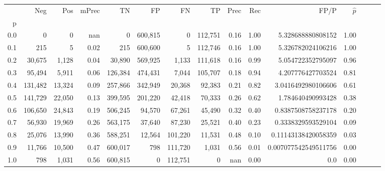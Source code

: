 \begin{tabular}{rrrrrrrrrrrrrrr}
\toprule
{} &      Neg &     Pos & mPrec &       TN &       FP &       FN &       TP &  Prec &   Rec &                  FP/P & $\hat{p}$ \\
p   &          &         &       &          &          &          &          &       &       &                       &           \\
\midrule
0.0 &        0 &       0 &   nan &        0 &  600,815 &        0 &  112,751 &  0.16 &  1.00 &     5.328688880808152 &      1.00 \\
0.1 &      215 &       5 &  0.02 &      215 &  600,600 &        5 &  112,746 &  0.16 &  1.00 &     5.326782024106216 &      1.00 \\
0.2 &   30,675 &   1,128 &  0.04 &   30,890 &  569,925 &    1,133 &  111,618 &  0.16 &  0.99 &     5.054722352795097 &      0.96 \\
0.3 &   95,494 &   5,911 &  0.06 &  126,384 &  474,431 &    7,044 &  105,707 &  0.18 &  0.94 &     4.207776427703524 &      0.81 \\
0.4 &  131,482 &  13,324 &  0.09 &  257,866 &  342,949 &   20,368 &   92,383 &  0.21 &  0.82 &    3.0416492980106606 &      0.61 \\
0.5 &  141,729 &  22,050 &  0.13 &  399,595 &  201,220 &   42,418 &   70,333 &  0.26 &  0.62 &     1.784640490993428 &      0.38 \\
0.6 &  106,650 &  24,843 &  0.19 &  506,245 &   94,570 &   67,261 &   45,490 &  0.32 &  0.40 &    0.8387508758237178 &      0.20 \\
0.7 &   56,930 &  19,969 &  0.26 &  563,175 &   37,640 &   87,230 &   25,521 &  0.40 &  0.23 &    0.3338329593529104 &      0.09 \\
0.8 &   25,076 &  13,990 &  0.36 &  588,251 &   12,564 &  101,220 &   11,531 &  0.48 &  0.10 &   0.11143138420058359 &      0.03 \\
0.9 &   11,766 &  10,500 &  0.47 &  600,017 &      798 &  111,720 &    1,031 &  0.56 &  0.01 &  0.007077542549511756 &      0.00 \\
1.0 &      798 &   1,031 &  0.56 &  600,815 &        0 &  112,751 &        0 &   nan &  0.00 &                   0.0 &      0.00 \\
\bottomrule
\end{tabular}
